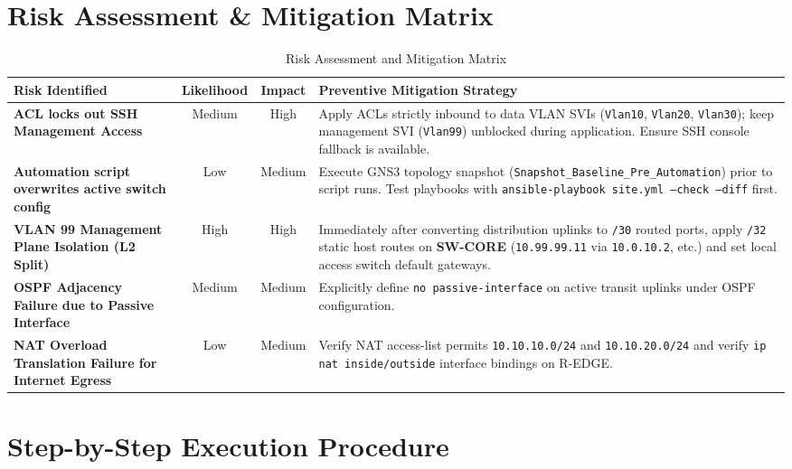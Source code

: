 \documentclass[11pt,a4paper]{article}
\newcommand{\hr}{\vspace{0.2cm}\noindent\hrulefill\vspace{0.2cm}}
\begin{document}
\hr

\section{Risk Assessment \& Mitigation Matrix}

\begin{table}[htbp]
\centering
\caption{Risk Assessment and Mitigation Matrix}
\label{tab:risk_matrix}
\small
\begin{tabularx}{\textwidth}{@{}L c c L@{}}
\toprule
\textbf{Risk Identified} & \textbf{Likelihood} & \textbf{Impact} & \textbf{Preventive Mitigation Strategy} \\
\midrule
\textbf{ACL locks out SSH Management Access} & Medium & High & Apply ACLs strictly inbound to data VLAN SVIs (\texttt{Vlan10}, \texttt{Vlan20}, \texttt{Vlan30}); keep management SVI (\texttt{Vlan99}) unblocked during application. Ensure SSH console fallback is available. \\
\midrule
\textbf{Automation script overwrites active switch config} & Low & Medium & Execute GNS3 topology snapshot (\texttt{Snapshot\_Baseline\_Pre\_Automation}) prior to script runs. Test playbooks with \texttt{ansible-playbook site.yml --check --diff} first. \\
\midrule
\textbf{VLAN 99 Management Plane Isolation (L2 Split)} & High & High & Immediately after converting distribution uplinks to \texttt{/30} routed ports, apply \texttt{/32} static host routes on \textbf{SW-CORE} (\texttt{10.99.99.11} via \texttt{10.0.10.2}, etc.) and set local access switch default gateways. \\
\midrule
\textbf{OSPF Adjacency Failure due to Passive Interface} & Medium & Medium & Explicitly define \texttt{no passive-interface} on active transit uplinks under OSPF configuration. \\
\midrule
\textbf{NAT Overload Translation Failure for Internet Egress} & Low & Medium & Verify NAT access-list permits \texttt{10.10.10.0/24} and \texttt{10.10.20.0/24} and verify \texttt{ip nat inside/outside} interface bindings on R-EDGE. \\
\bottomrule
\end{tabularx}
\end{table}

\hr

\section{Step-by-Step Execution Procedure}
\end{document}
